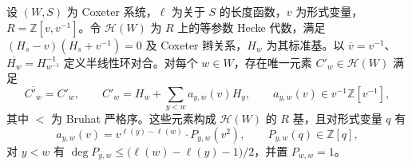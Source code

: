 \begin{theorem}\label{b5:thm:kl-basis}
	设 \((W,S)\) 为 Coxeter 系统，\(\ell\) 为关于 \(S\) 的长度函数，\(v\) 为形式变量，\(R=\mathbb Z[v,v^{-1}]\)。令 \(\mathcal H(W)\) 为 \(R\) 上的等参数 Hecke 代数，满足 \((H_s-v)(H_s+v^{-1})=0\) 及 Coxeter 辫关系，\(H_w\) 为其标准基。以 \(\overline v=v^{-1}\)、\(\overline{H_w}=H_{w^{-1}}^{-1}\) 定义半线性环对合。对每个 \(w\in W\)，存在唯一元素 \(C'_w\in\mathcal H(W)\) 满足
	\[
		\overline{C'_w}=C'_w,\qquad C'_w=H_w+\sum_{y<w}a_{y,w}(v)H_y,\qquad a_{y,w}(v)\in v^{-1}\mathbb Z[v^{-1}],
	\]
	其中 \(<\) 为 Bruhat 严格序。这些元素构成 \(\mathcal H(W)\) 的 \(R\) 基，且对形式变量 \(q\) 有
	\[
		a_{y,w}(v)=v^{\ell(y)-\ell(w)}\cdot P_{y,w}(v^2), \qquad P_{y,w}(q)\in\mathbb Z[q],
	\]
	对 \(y<w\) 有 \(\deg P_{y,w}\le\bigl(\ell(w)-\ell(y)-1\bigr)/2\)，并置 \(P_{w,w}=1\)。
\end{theorem}

